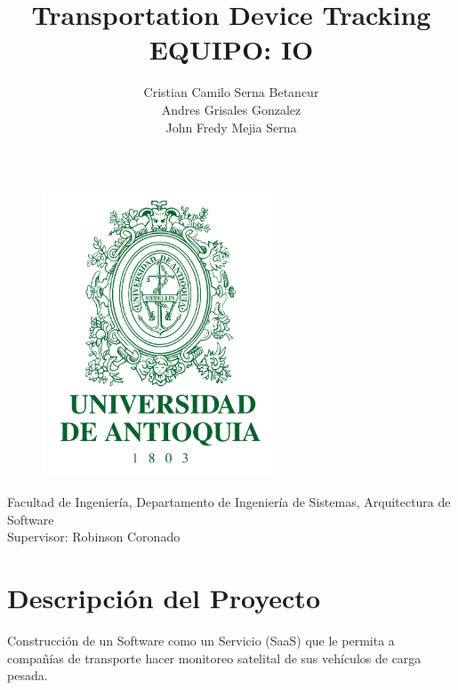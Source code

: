 \documentclass{article}
\title{\huge{\textbf{Transportation Device Tracking}} \\
\LARGE{EQUIPO: IO}}
\author{Cristian Camilo Serna Betancur \\ Andres Grisales Gonzalez \\ John Fredy Mejia Serna}
\begin{document}
\clearpage

\maketitle

\thispagestyle{empty}

\begin{center}
\begin{figure}[h]
    \centering
    \includegraphics[width=7cm]{pics/udea.png}%
    \label{fig:logo}\end{figure}
    \large{Facultad de Ingeniería, Departamento de Ingeniería de Sistemas,
     Arquitectura de Software \\ Supervisor: Robinson Coronado}
\end{center}

\newpage

\setcounter{page}{1}
\tableofcontents


\section{Descripción del Proyecto}
Construcción de un Software como un Servicio (SaaS) que le permita a compañías de transporte hacer monitoreo satelital de sus vehículos de carga pesada.
\end{document}
